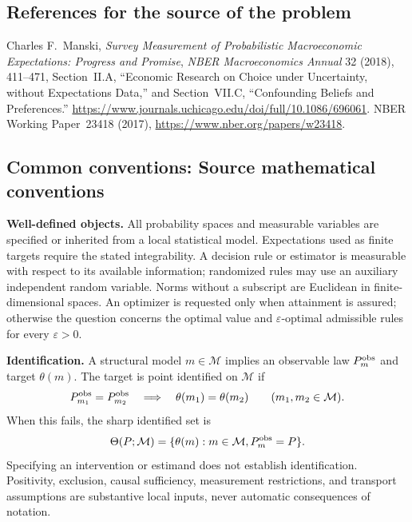\documentclass[11pt,a4paper]{article}
\begin{document}
\subsection*{References for the source of the problem}
Charles F.~Manski, \emph{Survey Measurement of Probabilistic Macroeconomic Expectations: Progress and Promise}, \emph{NBER Macroeconomics Annual} 32 (2018), 411--471, Section~II.A, ``Economic Research on Choice under Uncertainty, without Expectations Data,'' and Section~VII.C, ``Confounding Beliefs and Preferences.'' \url{https://www.journals.uchicago.edu/doi/full/10.1086/696061}. NBER Working Paper~23418 (2017), \url{https://www.nber.org/papers/w23418}.

\subsection*{Common conventions: Source mathematical conventions}

\textbf{Well-defined objects.}
All probability spaces and measurable variables are specified or inherited
from a local statistical model. Expectations used as finite targets require
the stated integrability. A decision rule or estimator is measurable with
respect to its available information; randomized rules may use an auxiliary
independent random variable. Norms without a subscript are Euclidean in
finite-dimensional spaces. An optimizer is requested only when attainment
is assured; otherwise the question concerns the optimal value and
$\varepsilon$-optimal admissible rules for every $\varepsilon>0$.

\textbf{Identification.}
A structural model $m\in\mathcal M$ implies an observable law
$P_m^{\rm obs}$ and target $\theta(m)$. The target is point identified on
$\mathcal M$ if
\[
 P_{m_1}^{\rm obs}=P_{m_2}^{\rm obs}
 \quad\Longrightarrow\quad\theta(m_1)=\theta(m_2)
 \qquad(m_1,m_2\in\mathcal M).
\]
When this fails, the sharp identified set is
\[
 \Theta(P;\mathcal M)=\{\theta(m):m\in\mathcal M,
                                  P_m^{\rm obs}=P\}.
\]
Specifying an intervention or estimand does not establish identification.
Positivity, exclusion, causal sufficiency, measurement restrictions, and
transport assumptions are substantive local inputs, never automatic
consequences of notation.
\end{document}
